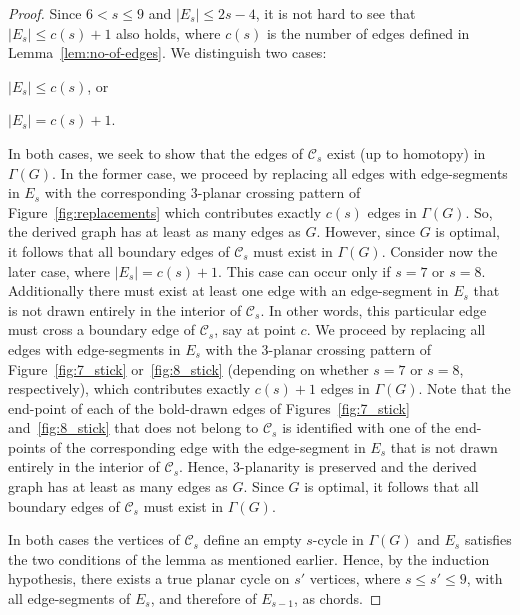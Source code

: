 \begin{proof}
Since $6<s\leq 9$ and $|E_{s}| \leq 2s-4$, it is not hard to see that $|E_s|\leq c(s)+1$ also holds, where $c(s)$ is the number of edges defined in Lemma~\ref{lem:no-of-edges}. We distinguish two cases:%
\begin{inparaenum}[(i)]
\item $|E_s|\leq c(s)$, or 
\item $|E_s|= c(s)+1$.
\end{inparaenum}
In both cases, we seek to show that the edges of $\mathcal{C}_s$ exist (up to homotopy) in $\Gamma(G)$. In the former case, we proceed by replacing all edges with edge-segments in $E_s$ with the corresponding $3$-planar crossing pattern of Figure~\ref{fig:replacements} which contributes exactly $c(s)$ edges in $\Gamma(G)$. So, the derived graph has at least as many edges as $G$. However, since $G$ is optimal, it follows that all boundary edges of $\mathcal{C}_s$ must exist in $\Gamma(G)$. Consider now the later case, where $|E_s|= c(s)+1$. This case can occur only if $s=7$ or $s=8$. Additionally there must exist at least one edge with an edge-segment in $E_s$ that is not drawn entirely in the interior of $\mathcal{C}_s$. In other words, this particular edge must cross a boundary edge of $\mathcal{C}_s$, say at point $c$. We proceed by replacing all edges with edge-segments in $E_s$ with the $3$-planar crossing pattern of Figure~\ref{fig:7_stick} or~\ref{fig:8_stick} (depending on whether $s=7$ or $s=8$, respectively), which contributes exactly $c(s)+1$ edges in $\Gamma(G)$. Note that the end-point of each of the bold-drawn edges of Figures~\ref{fig:7_stick} and~\ref{fig:8_stick} that does not belong to $\mathcal{C}_s$ is identified with one of the end-points of the corresponding edge with the edge-segment in $E_s$ that is not drawn entirely in the interior of $\mathcal{C}_s$. Hence, $3$-planarity is preserved and the derived graph has at least as many edges as $G$. Since $G$ is optimal, it follows that all boundary edges of $\mathcal{C}_s$ must exist in $\Gamma(G)$.

In both cases the vertices of $\mathcal{C}_s$ define an empty $s$-cycle in $\Gamma(G)$ and $E_s$ satisfies the two conditions of the lemma as mentioned earlier. Hence, by the induction hypothesis, there exists a true planar cycle on $s'$ vertices, where $s\leq s'\leq 9$, with all edge-segments of $E_s$, and therefore of $E_{s-1}$,  as chords.
\end{proof}


